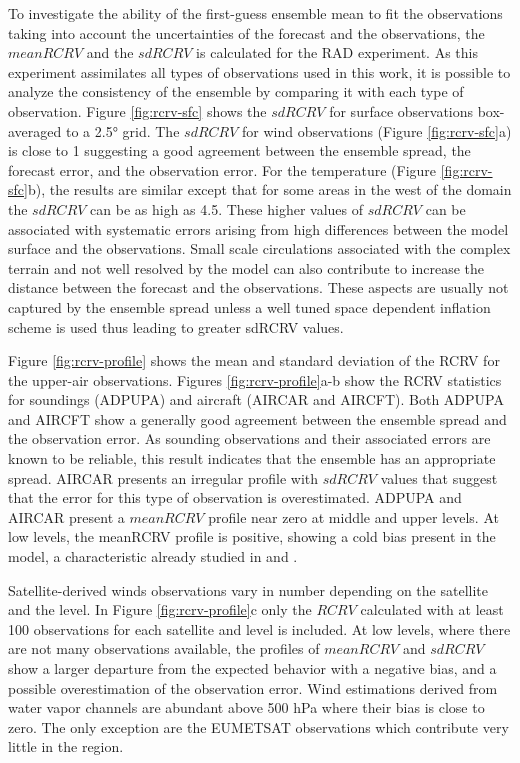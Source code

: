 \documentclass[final,5p,times,twocolumn,authoryear]{elsarticle} %
\begin{document}
To investigate the ability of the first-guess ensemble mean to fit the observations taking into account the uncertainties of the forecast and the observations, the \(mean RCRV\) and the \(sd RCRV\) is calculated for the RAD experiment. As this experiment assimilates all types of observations used in this work, it is possible to analyze the consistency of the ensemble by comparing it with each type of observation. Figure \ref{fig:rcrv-sfc} shows the \(sd RCRV\) for surface observations box-averaged to a 2.5° grid. The \(sd RCRV\) for wind observations (Figure \ref{fig:rcrv-sfc}a) is close to 1 suggesting a good agreement between the ensemble spread, the forecast error, and the observation error. For the temperature (Figure \ref{fig:rcrv-sfc}b), the results are similar except that for some areas in the west of the domain the \(sd RCRV\) can be as high as 4.5. These higher values of \(sdRCRV\) can be associated with systematic errors arising from high differences between the model surface and the observations. Small scale circulations associated with the complex terrain and not well resolved by the model can also contribute to increase the distance between the forecast and the observations. These aspects are usually not captured by the ensemble spread unless a well tuned space dependent inflation scheme is used thus leading to greater sdRCRV values.

Figure \ref{fig:rcrv-profile} shows the mean and standard deviation of the RCRV for the upper-air observations. Figures \ref{fig:rcrv-profile}a-b show the RCRV statistics for soundings (ADPUPA) and aircraft (AIRCAR and AIRCFT). Both ADPUPA and AIRCFT show a generally good agreement between the ensemble spread and the observation error. As sounding observations and their associated errors are known to be reliable, this result indicates that the ensemble has an appropriate spread. AIRCAR presents an irregular profile with \(sd RCRV\) values that suggest that the error for this type of observation is overestimated. ADPUPA and AIRCAR present a \(mean RCRV\) profile near zero at middle and upper levels. At low levels, the meanRCRV profile is positive, showing a cold bias present in the model, a characteristic already studied in \citet{ruiz2010} and \citet{dillon2021}.

Satellite-derived winds observations vary in number depending on the satellite and the level. In Figure \ref{fig:rcrv-profile}c only the \(RCRV\) calculated with at least 100 observations for each satellite and level is included. At low levels, where there are not many observations available, the profiles of \(mean RCRV\) and \(sd RCRV\) show a larger departure from the expected behavior with a negative bias, and a possible overestimation of the observation error. Wind estimations derived from water vapor channels are abundant above 500 hPa where their bias is close to zero. The only exception are the EUMETSAT observations which contribute very little in the region.
\end{document}
